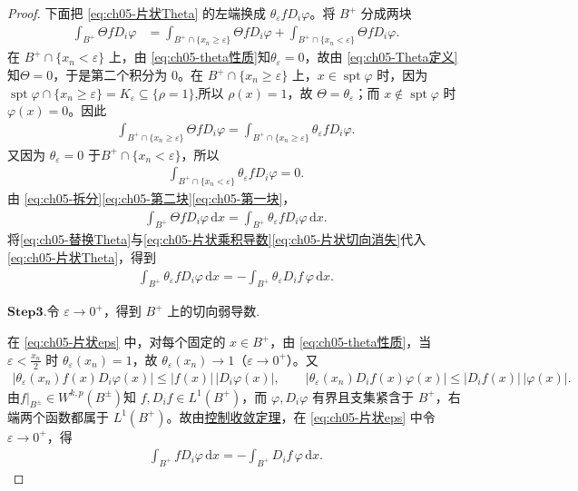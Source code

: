 \documentclass[../../main.tex]{subfiles}
\begin{document}
\begin{proof}
下面把 \eqref{eq:ch05-片状Theta} 的左端换成 $\theta_{\varepsilon}fD_i\varphi$。将 $B^{+}$ 分成两块
\begin{align}
\int_{B^{+}}\Theta fD_i\varphi
&=\int_{B^{+}\cap\{x_n\geqslant\varepsilon\}}\Theta fD_i\varphi
+\int_{B^{+}\cap\{x_n<\varepsilon\}}\Theta fD_i\varphi.
\label{eq:ch05-拆分}
\end{align}
在 $B^{+}\cap\{x_n<\varepsilon\}$ 上，由 \eqref{eq:ch05-theta性质}知$\theta_{\varepsilon}=0$，故由 \eqref{eq:ch05-Theta定义}知$\Theta=0$，于是第二个积分为 $0$。在 $B^{+}\cap\{x_n\geqslant\varepsilon\}$ 上，$x\in\operatorname{spt}\varphi$ 时，因为 $\operatorname{spt}\varphi\cap\{x_n\geqslant\varepsilon\}=K_{\varepsilon}\subseteq\{\rho=1\}$,所以 $\rho(x)=1$，故 $\Theta=\theta_{\varepsilon}$；而 $x\notin\operatorname{spt}\varphi$ 时 $\varphi(x)=0$。因此
\begin{align}
\int_{B^{+}\cap\{x_n\geqslant\varepsilon\}}\Theta fD_i\varphi
=\int_{B^{+}\cap\{x_n\geqslant\varepsilon\}}\theta_{\varepsilon}fD_i\varphi.
\label{eq:ch05-第一块}
\end{align}
又因为 $\theta_{\varepsilon}=0$ 于$B^{+}\cap\{x_n<\varepsilon\}$，所以
\begin{align}
\int_{B^{+}\cap\{x_n<\varepsilon\}}\theta_{\varepsilon}fD_i\varphi=0.
\label{eq:ch05-第二块}
\end{align}
由 \eqref{eq:ch05-拆分}\eqref{eq:ch05-第二块}\eqref{eq:ch05-第一块}，
\begin{align}
\int_{B^{+}}\Theta fD_i\varphi\,\mathrm{d}x
=\int_{B^{+}}\theta_{\varepsilon}fD_i\varphi\,\mathrm{d}x.
\label{eq:ch05-替换Theta}
\end{align}
将\eqref{eq:ch05-替换Theta}与\eqref{eq:ch05-片状乘积导数}\eqref{eq:ch05-片状切向消失}代入\eqref{eq:ch05-片状Theta}，得到
\begin{align}
\int_{B^{+}}\theta_{\varepsilon}fD_i\varphi\,\mathrm{d}x
=-\int_{B^{+}}\theta_{\varepsilon}D_if\,\varphi\,\mathrm{d}x.
\label{eq:ch05-片状eps}
\end{align}

\noindent$\mathbf{Step}\bm{3}$.{\heiti 令 $\varepsilon\to0^{+}$，得到 $B^{+}$ 上的切向弱导数.}

在 \eqref{eq:ch05-片状eps} 中，对每个固定的 $x\in B^{+}$，由 \eqref{eq:ch05-theta性质}，当 $\varepsilon<\frac{x_n}{2}$ 时 $\theta_{\varepsilon}(x_n)=1$，故 $\theta_{\varepsilon}(x_n)\to1$（$\varepsilon\to0^{+}$）。又
\begin{align*}
|\theta_{\varepsilon}(x_n)f(x)D_i\varphi(x)|\leqslant|f(x)|\,|D_i\varphi(x)|,\qquad
|\theta_{\varepsilon}(x_n)D_if(x)\varphi(x)|\leqslant|D_if(x)|\,|\varphi(x)|.
\end{align*}
由$f|_{B^{\pm}}\in W^{k,p}(B^{\pm})$知 $f,D_if\in L^{1}(B^{+})$，而 $\varphi,D_i\varphi$ 有界且支集紧含于 $B^{+}$，右端两个函数都属于 $L^{1}(B^{+})$。故由\hyperref[Real Analysis-theorem:控制收敛定理]{控制收敛定理}，在 \eqref{eq:ch05-片状eps} 中令 $\varepsilon\to0^{+}$，得
\begin{align}
\int_{B^{+}}fD_i\varphi\,\mathrm{d}x
=-\int_{B^{+}}D_if\,\varphi\,\mathrm{d}x.
\label{eq:ch05-片状切向}
\end{align}


\end{proof}
\end{document}
